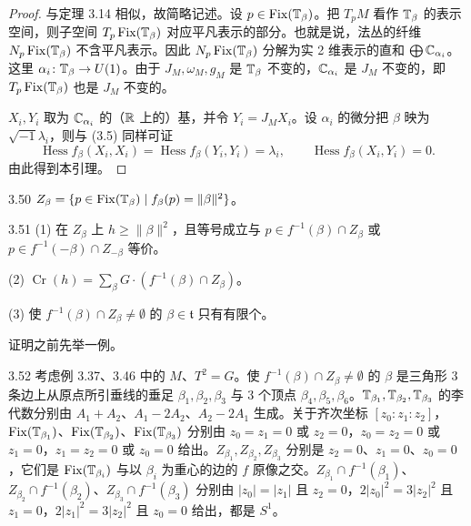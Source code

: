 \begin{proof}
  与定理 3.14 相似，故简略记述。设 $p\in\operatorname{Fix}(\mathbb{T}_\beta)$。把 $T_pM$ 看作 $\mathbb{T}_\beta$ 的表示空间，则子空间 $T_p\operatorname{Fix}(\mathbb{T}_\beta)$ 对应平凡表示的部分。也就是说，法丛的纤维 $N_p\operatorname{Fix}(\mathbb{T}_\beta)$ 不含平凡表示。因此 $N_p\operatorname{Fix}(\mathbb{T}_\beta)$ 分解为实 2 维表示的直和 $\bigoplus\mathbb{C}_{\alpha_i}$。这里 $\alpha_i\colon\mathbb{T}_\beta\to U(1)$。由于 $J_M,\omega_M,g_M$ 是 $\mathbb{T}_\beta$ 不变的，$\mathbb{C}_{\alpha_i}$ 是 $J_M$ 不变的，即 $T_p\operatorname{Fix}(\mathbb{T}_\beta)$ 也是 $J_M$ 不变的。

  $X_i,Y_i$ 取为 $\mathbb{C}_{\alpha_i}$ 的（$\mathbb{R}$ 上的）基，并令 $Y_i=J_MX_i$。设 $\alpha_i$ 的微分把 $\beta$ 映为 $\sqrt{-1}\lambda_i$，则与 (3.5) 同样可证
  \[
    \operatorname{Hess}f_\beta(X_i,X_i)=\operatorname{Hess}f_\beta(Y_i,Y_i)=\lambda_i,\qquad
    \operatorname{Hess}f_\beta(X_i,Y_i)=0.
  \]
  由此得到本引理。
\end{proof}


\begin{definition}{3.50}
  $Z_\beta=\{p\in\operatorname{Fix}(\mathbb{T}_\beta)\mid f_\beta(p)=\|\beta\|^2\}$。
\end{definition}

\begin{proposition*}{3.51}
  (1) 在 $Z_\beta$ 上 $h\ge\|\beta\|^2$，且等号成立与 $p\in f^{-1}(\beta)\cap Z_\beta$ 或 $p\in f^{-1}(-\beta)\cap Z_{-\beta}$ 等价。

  (2) $\operatorname{Cr}(h)=\sum_\beta G\cdot(f^{-1}(\beta)\cap Z_\beta)$。

  (3) 使 $f^{-1}(\beta)\cap Z_\beta\neq\emptyset$ 的 $\beta\in\mathfrak{t}$ 只有有限个。
\end{proposition*}

证明之前先举一例。

\begin{example}{3.52}
  考虑例 3.37、3.46 中的 $M$、$T^2=G$。使 $f^{-1}(\beta)\cap Z_\beta\neq\emptyset$ 的 $\beta$ 是三角形 3 条边上从原点所引垂线的垂足 $\beta_1,\beta_2,\beta_3$ 与 3 个顶点 $\beta_4,\beta_5,\beta_6$。$\mathbb{T}_{\beta_1},\mathbb{T}_{\beta_2},\mathbb{T}_{\beta_3}$ 的李代数分别由 $A_1+A_2$、$A_1-2A_2$、$A_2-2A_1$ 生成。关于齐次坐标 $[z_0:z_1:z_2]$，$\operatorname{Fix}(\mathbb{T}_{\beta_1})$、$\operatorname{Fix}(\mathbb{T}_{\beta_2})$、$\operatorname{Fix}(\mathbb{T}_{\beta_3})$ 分别由 $z_0=z_1=0$ 或 $z_2=0$，$z_0=z_2=0$ 或 $z_1=0$，$z_1=z_2=0$ 或 $z_0=0$ 给出。$Z_{\beta_1},Z_{\beta_2},Z_{\beta_3}$ 分别是 $z_2=0$、$z_1=0$、$z_0=0$，它们是 $\operatorname{Fix}(\mathbb{T}_{\beta_i})$ 与以 $\beta_i$ 为重心的边的 $f$ 原像之交。$Z_{\beta_1}\cap f^{-1}(\beta_1)$、$Z_{\beta_2}\cap f^{-1}(\beta_2)$、$Z_{\beta_3}\cap f^{-1}(\beta_3)$ 分别由 $|z_0|=|z_1|$ 且 $z_2=0$，$2|z_0|^2=3|z_2|^2$ 且 $z_1=0$，$2|z_1|^2=3|z_2|^2$ 且 $z_0=0$ 给出，都是 $S^1$。
\end{example}

